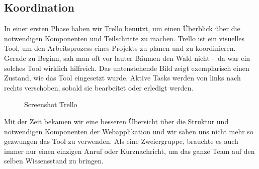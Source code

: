 \subsection{Koordination}

In einer ersten Phase haben wir Trello benutzt, um einen Überblick über die notwendigen Komponenten und Teilschritte zu machen. Trello ist ein visuelles Tool, um den Arbeitsprozess eines Projekts zu planen und zu koordinieren. Gerade zu Beginn, sah man oft vor lauter Bäumen den Wald nicht -- da war ein solches Tool wirklich hilfreich. Das untenstehende Bild zeigt exemplarisch einen Zustand, wie das Tool eingesetzt wurde. Aktive Tasks werden von links nach rechts verschoben, sobald sie bearbeitet oder erledigt werden.
\begin{figure}[ht]
    \caption{Screenshot Trello \cite{fig:trello}}
\end{figure}

Mit der Zeit bekamen wir eine besseren Übersicht über die Struktur und notwendigen Komponenten der Webapplikation und wir sahen uns nicht mehr so gezwungen das Tool zu verwenden. Als eine Zweiergruppe, brauchte es auch immer nur einen einzigen Anruf oder Kurznachricht, um das ganze Team auf den selben Wissensstand zu bringen.